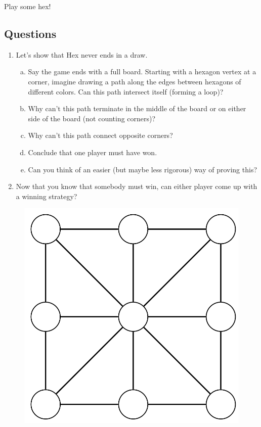 \documentclass[12pt]{article}
\begin{document}
\noindent Play some hex!


\subsection*{Questions}
\begin{enumerate}
	\item Let's show that Hex never ends in a draw.
	\begin{enumerate}[(a)]
		\item Say the game ends with a full board. Starting with a hexagon vertex at a corner, imagine drawing a path along the edges between hexagons of different colors. Can this path intersect itself (forming a loop)?
		\vspace{3cm}
		\item Why can't this path terminate in the middle of the board or on either side of the board (not counting corners)?
		\vspace{3cm}
		\item Why can't this path connect opposite corners?
		\vspace{3cm}
		\item Conclude that one player must have won.
		\vspace{3cm}
		\item Can you think of an easier (but maybe less rigorous) way of proving this?
		\vspace{3cm}
	\end{enumerate}

	\item Now that you know that somebody must win, can either player come up with a winning strategy?
\end{enumerate}

\newpage
\begin{figure}[h]
	\centering
	\includegraphics[scale=.7]{achi_empty.PNG}
\end{figure}
\end{document}

